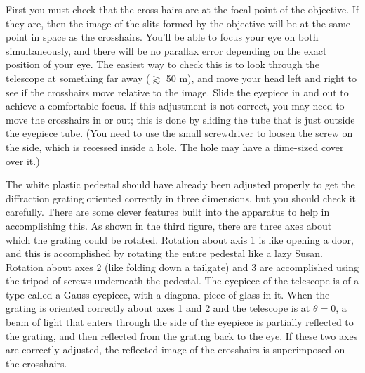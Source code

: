 First you must check that the cross-hairs are at the
focal point of the objective. If they are, then the image
of the slits formed by the objective will be at the same point
in space as the crosshairs. You'll be able to focus your eye on both
simultaneously, and there will be no parallax
error depending on the exact position of your eye.
The easiest way to check this is to look through the telescope
at something far away ($\gtrsim$ 50 m), and move your head left
and right to see if the crosshairs move relative to the image.
Slide the eyepiece in and out to achieve a comfortable focus.
If this adjustment is not correct, you may
need to move the crosshairs in or out; this is done
by sliding the tube that is just outside the eyepiece tube.
(You need to use the small screwdriver to loosen the screw
on the side, which is recessed inside a hole. The hole may
have a dime-sized cover over it.)

The white plastic pedestal should have already been adjusted
properly to get the diffraction grating oriented correctly
in three dimensions, but you should check it carefully.
There are some clever features built into the apparatus to help in
accomplishing this. As shown in the third figure, there are three
axes about which the grating could be rotated. Rotation about axis 1 is
like opening a door, and this is accomplished by rotating the entire pedestal like a lazy Susan. Rotation about
axes 2 (like folding down a tailgate) and 3 are accomplished using the
tripod of screws underneath the pedestal. 
The eyepiece of the telescope is of a type called a Gauss eyepiece, with a diagonal piece of
glass in it.  When the grating is oriented correctly about axes 1 and 2 and the telescope
is at $\theta=0$, a beam
of light that enters through the side of the eyepiece is partially reflected to
the grating, and then reflected from the grating back to the eye. If these two axes
are correctly adjusted, the reflected image of the crosshairs is superimposed on the
crosshairs.

